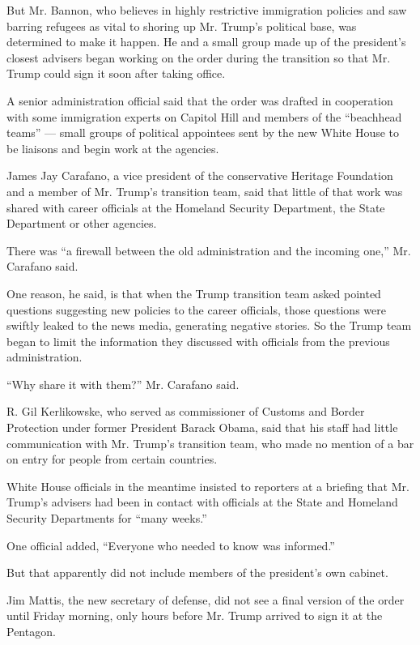 But Mr. Bannon, who believes in highly restrictive immigration policies
and saw barring refugees as vital to shoring up Mr. Trump's political
base, was determined to make it happen. He and a small group made up of
the president's closest advisers began working on the order during the
transition so that Mr. Trump could sign it soon after taking office.

A senior administration official said that the order was drafted in
cooperation with some immigration experts on Capitol Hill and members of
the ``beachhead teams'' --- small groups of political appointees sent by
the new White House to be liaisons and begin work at the agencies.

James Jay Carafano, a vice president of the conservative Heritage
Foundation and a member of Mr. Trump's transition team, said that little
of that work was shared with career officials at the Homeland Security
Department, the State Department or other agencies.

There was ``a firewall between the old administration and the incoming
one,'' Mr. Carafano said.

One reason, he said, is that when the Trump transition team asked
pointed questions suggesting new policies to the career officials, those
questions were swiftly leaked to the news media, generating negative
stories. So the Trump team began to limit the information they discussed
with officials from the previous administration.

``Why share it with them?'' Mr. Carafano said.

R. Gil Kerlikowske, who served as commissioner of Customs and Border
Protection under former President Barack Obama, said that his staff had
little communication with Mr. Trump's transition team, who made no
mention of a bar on entry for people from certain countries.

White House officials in the meantime insisted to reporters at a
briefing that Mr. Trump's advisers had been in contact with officials at
the State and Homeland Security Departments for ``many weeks.''

One official added, ``Everyone who needed to know was informed.''

But that apparently did not include members of the president's own
cabinet.

Jim Mattis, the new secretary of defense, did not see a final version of
the order until Friday morning, only hours before Mr. Trump arrived to
sign it at the Pentagon.

